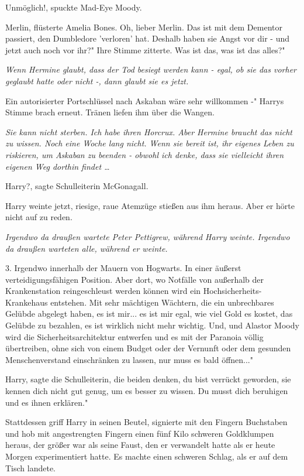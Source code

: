 \glqq{}Unmöglich!\grqq{}, spuckte Mad-Eye Moody.

\glqq{}Merlin\grqq{}, flüsterte Amelia Bones. \glqq{}Oh, lieber Merlin. Das ist
mit dem Dementor passiert, den Dumbledore 'verloren' hat. Deshalb haben sie
Angst vor dir - und jetzt auch noch vor ihr?" Ihre Stimme zitterte. \glqq{}Was
ist das, was ist das alles?"

\emph{Wenn Hermine glaubt, dass der Tod besiegt werden kann - egal, ob sie das
vorher geglaubt hatte oder nicht -, dann glaubt sie es jetzt.}

\glqq{}Ein autorisierter Portschlüssel nach Askaban wäre sehr willkommen -"
Harrys Stimme brach erneut. Tränen liefen ihm über die Wangen.

\emph{Sie kann nicht sterben. Ich habe ihren Horcrux. Aber Hermine braucht das
nicht zu wissen. Noch eine Woche lang nicht. Wenn sie bereit ist, ihr eigenes
Leben zu riskieren, um Askaban zu beenden - obwohl ich denke, dass sie
vielleicht ihren eigenen Weg dorthin findet …}

Harry?\grqq{}, sagte Schulleiterin McGonagall.

Harry weinte jetzt, riesige, raue Atemzüge stießen aus ihm heraus. Aber er hörte
nicht auf zu reden.

\emph{Irgendwo da draußen wartete Peter Pettigrew, während Harry weinte.
Irgendwo da draußen warteten alle, während er weinte.}

\glqq{}3. Irgendwo innerhalb der Mauern von Hogwarts. In einer äußerst
verteidigungsfähigen Position. Aber dort, wo Notfälle von außerhalb der
Krankenstation reingeschleust werden können wird ein Hochsicherheits-Krankehaus
entstehen. Mit sehr mächtigen Wächtern, die ein unbrechbares Gelübde abgelegt
haben, es ist mir... es ist mir egal, wie viel Gold es kostet, das Gelübde zu
bezahlen, es ist wirklich nicht mehr wichtig. Und, und Alastor Moody wird die
Sicherheitsarchitektur entwerfen und es mit der Paranoia völlig übertreiben,
ohne sich von einem Budget oder der Vernunft oder dem gesunden Menschenverstand
einschränken zu lassen, nur muss es bald öffnen..."

\glqq{}Harry\grqq{}, sagte die Schulleiterin, \glqq{}die beiden denken, du bist
verrückt geworden, sie kennen dich nicht gut genug, um es besser zu wissen. Du
musst dich beruhigen und es ihnen erklären."

Stattdessen griff Harry in seinen Beutel, signierte mit den Fingern Buchstaben
und hob mit angestrengten Fingern einen fünf Kilo schweren Goldklumpen heraus,
der größer war als seine Faust, den er verwandelt hatte als er heute Morgen
experimentiert hatte. Es machte einen schweren Schlag, als er auf dem Tisch
landete.

